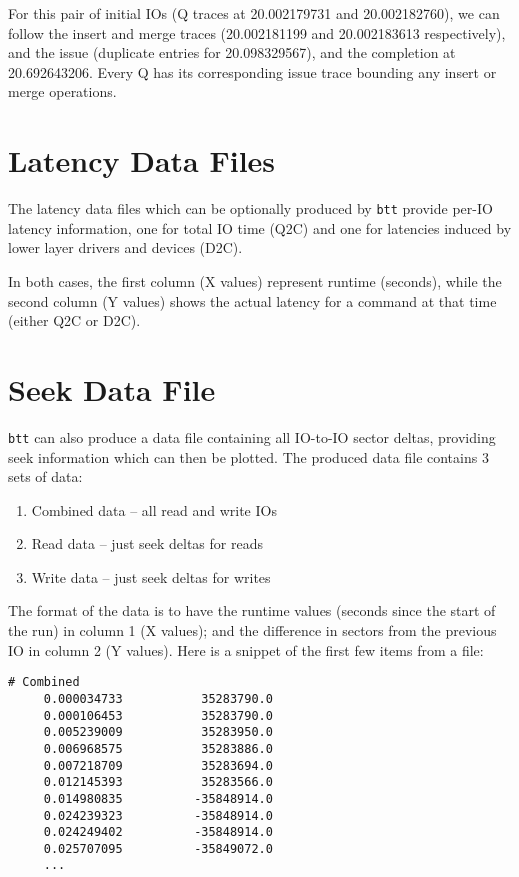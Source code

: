 \documentclass{article}
\begin{document}
  For this pair of initial IOs (Q traces at 20.002179731 and
  20.002182760), we can follow the insert and merge traces (20.002181199
  and 20.002183613 respectively), and the issue (duplicate entries for
  20.098329567), and the completion at 20.692643206. Every Q has its
  corresponding issue trace bounding any insert or merge operations.

\newpage\section{\label{sec:lat}\label{sec:lat-q2c}\label{sec:lat-d2c}Latency Data Files}

  The latency data files which can be optionally produced by \texttt{btt}
  provide per-IO latency information, one for total IO time (Q2C) and
  one for latencies induced by lower layer drivers and devices (D2C).

  In both cases, the first column (X values) represent runtime (seconds),
  while the second column (Y values) shows the actual latency for a
  command at that time (either Q2C or D2C).

\newpage\section{\label{sec:seek}Seek Data File}

  \texttt{btt} can also produce a data file containing all IO-to-IO sector
  deltas, providing seek information which can then be plotted. The
  produced data file contains 3 sets of data:

  \begin{enumerate}
     \item Combined data -- all read and write IOs

     \item Read data -- just seek deltas for reads

     \item Write data -- just seek deltas for writes
  \end{enumerate}

  The format of the data is to have the runtime values (seconds since
  the start of the run) in column 1 (X values); and the difference in
  sectors from the previous IO in column 2 (Y values). Here is a snippet
  of the first few items from a file:

\begin{verbatim}
# Combined
     0.000034733           35283790.0
     0.000106453           35283790.0
     0.005239009           35283950.0
     0.006968575           35283886.0
     0.007218709           35283694.0
     0.012145393           35283566.0
     0.014980835          -35848914.0
     0.024239323          -35848914.0
     0.024249402          -35848914.0
     0.025707095          -35849072.0
     ...
\end{verbatim}
\end{document}
